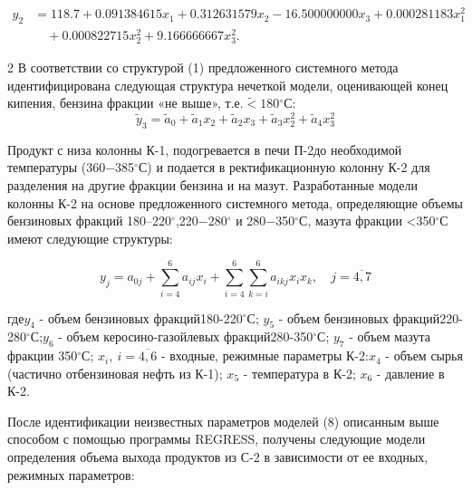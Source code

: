 \begin{equation}
\begin{aligned}
y_{2} &= 118.7 + 0.091384615x_{1} + 0.312631579x_{2} - 16.500000000x_{3} + 0.000281183x_{1}^{2} \\
      &\quad + 0.000822715x_{2}^{2} + 9.166666667x_{3}^{2}.
\end{aligned}
\end{equation}

\begin{multicols}{2}
В соответствии со структурой (1) предложенного системного метода
идентифицирована следующая структура нечеткой модели, оценивающей конец
кипения, бензина фракции «не выше»,
т.е.\(\widetilde{<}180\)$^\circ$С:
\vspace{-0.3em}
\begin{equation}
{\widetilde{y}}_{3} = {\widetilde{a}}_{0} + {\widetilde{a}}_{1}x_{2} + {\widetilde{a}}_{2}x_{3} + {\widetilde{a}}_{3}x_{2}^{2} + {\widetilde{a}}_{4}x_{3}^{2}
\end{equation}

Продукт с низа колонны К-1, подогревается в печи П-2до необходимой
температуры (360\(-\)385$^\circ$С) и подается в
ректификационную колонну К-2 для разделения на другие фракции бензина и
на мазут. Разработанные модели колонны К-2 на основе предложенного
системного метода, определяющие объемы бензиновых фракций
180--220$^\circ$,220−280$^\circ$ и
280−350$^\circ$С, мазута фракции
<350$^\circ$С имеют следующие структуры:

\begin{equation}
y_{j} = a_{0j} + \sum_{i = 4}^{6} a_{ij}x_{i} + \sum_{i = 4}^{6} \sum_{k = i}^{6} a_{ikj}x_{i}x_{k}, \quad j = \overline{4,7}
\end{equation}

где\(y_{4}\) - объем бензиновых фракций180-220$^\circ$С;
\(y_{5}\) - объем бензиновых
фракций220-280$^\circ$С;\(y_{6}\) - объем керосино-газойлевых
фракций280-350$^\circ$С; \(y_{7}\) - объем мазута фракции
350$^\circ$С; \(x_{i},\ i = \overline{4,6}\) - входные,
режимные параметры К-2:\(x_{4}\) - объем сырья (частично отбензиновая
нефть из К-1); \(x_{5}\) - температура в К-2; \(x_{6}\) - давление в К-2.

После идентификации неизвестных параметров моделей (8) описанным выше
способом с помощью программы REGRESS, получены следующие модели
определения объема выхода продуктов из С-2 в зависимости от ее входных,
режимных параметров:
\end{multicols}
\vspace{-0.5em}
